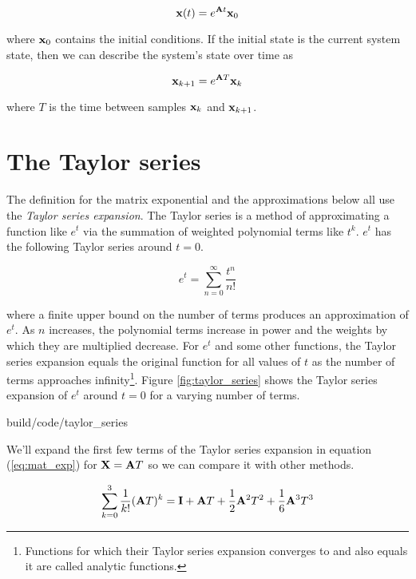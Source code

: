 \begin{equation*}
  \mathbf{x}(t) = e^{\mathbf{A}t} \mathbf{x}_0
\end{equation*}

where $\mathbf{x}_0$ contains the initial conditions. If the initial state is the
current system state, then we can describe the system's state over time as

\begin{equation*}
  \mathbf{x}_{k+1} = e^{\mathbf{A}T} \mathbf{x}_k
\end{equation*}

where $T$ is the time between samples $\mathbf{x}_k$ and $\mathbf{x}_{k+1}$.

\section{The Taylor series}
The definition for the matrix exponential and the approximations below all use
the \textit{Taylor series expansion}. The Taylor series is a method of
approximating a function like $e^t$ via the summation of weighted polynomial
terms like $t^k$. $e^t$ has the following Taylor series around $t = 0$.

\begin{equation*}
  e^t = \sum_{n = 0}^\infty \frac{t^n}{n!}
\end{equation*}

where a finite upper bound on the number of terms produces an approximation of
$e^t$. As $n$ increases, the polynomial terms increase in power and the weights
by which they are multiplied decrease. For $e^t$ and some other functions, the
Taylor series expansion equals the original function for all values of $t$ as
the number of terms approaches infinity\footnote{Functions for which their
Taylor series expansion converges to and also equals it are called analytic
functions.}. Figure \ref{fig:taylor_series} shows the Taylor series expansion of
$e^t$ around $t = 0$ for a varying number of terms.

\begin{svg}{build/code/taylor_series}
  \caption{Taylor series expansions of $e^t$ around $t = 0$ for $n$ terms}
  \label{fig:taylor_series}
\end{svg}

We'll expand the first few terms of the Taylor series expansion in equation
(\ref{eq:mat_exp}) for $\mathbf{X} = \mathbf{A}T$ so we can compare it with other
methods.

\begin{equation*}
  \sum_{k=0}^3 \frac{1}{k!} (\mathbf{A}T)^k = \mathbf{I} + \mathbf{A}T +
    \frac{1}{2}\mathbf{A}^2T^2 + \frac{1}{6}\mathbf{A}^3T^3
\end{equation*}

